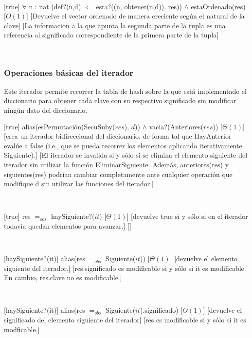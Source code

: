 ~

[true]
{$\forall$ n : nat (def?(n,d) $\Leftarrow$ esta?((n, obtener(n,d)), res)) $\land$ estaOrdenado(res)}
[$O(1)$]
[Devuelve el vector ordenado de manera creciente según el natural de la clave]
[La informacion a la que apunta la segunda parte de la tupla es una referencia al significado correspondiente de la primera parte de la tupla]

~

\subsubsection{Operaciones básicas del iterador}

Este iterador permite recorrer la tabla de hash sobre la que est\'{a} implementado el diccionario para obtener cada clave con su respectivo significado sin modificar ning\'{u}n dato del diccionario.

[true]
{alias(esPermutación(SecuSuby($res$), $d$)) $\land$ vacia?(Anteriores($res$))}
[$\Theta(1)$]
[crea un iterador bidireccional del diccionario, de forma tal que HayAnterior evalúe a false (i.e.,
que se pueda recorrer los elementos aplicando iterativamente Siguiente).]
[El iterador se invalida si y sólo si se elimina el elemento siguiente del iterador sin utilizar la función
EliminarSiguiente. Además, anteriores(res) y siguientes(res) podrían cambiar completamente ante cualquier
operación que modifique d sin utilizar las funciones del iterador.]

~

[true]
{res $=_{obs}$ haySiguiente?($it$)}
[$\Theta(1)$]
[devuelve true si y sólo si en el iterador todavía quedan elementos para avanzar.]
[]

~

[haySiguiente?(it)]
{alias(res $=_{obs}$ Siguiente($it$))}
[$\Theta(1)$]
[devuelve el elemento siguiente del iterador.]
[res.significado es modificable si y sólo si it es modificable. En cambio, res.clave no es modificable.]

~

[haySiguiente?(it)]
{alias(res $=_{obs}$ Siguiente($it$).significado)}
[$\Theta(1)$]
[devuelve el significado del elemento siguiente del iterador]
[res es modificable si y sólo si it es modficable.]

